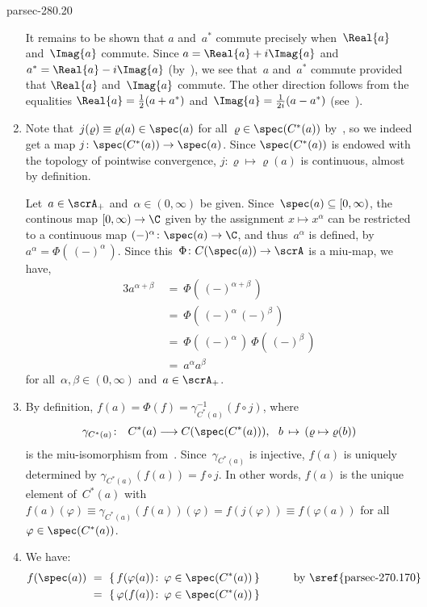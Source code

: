 \documentclass[b5page]{book}
\begin{document}
\begin{solution}{parsec-280.20}
\begin{enumerate}
It remains to be shown that $a$ and~$a^*$
commute precisely when~$\Real{a}$ and~$\Imag{a}$ commute.
Since $a=\Real{a}+i\Imag{a}$
and $a^*=\Real{a}-i\Imag{a}$ (by~),
we see that~$a$ and~$a^*$ commute provided that $\Real{a}$ and~$\Imag{a}$
commute.
The other direction follows from the equalities
$\Real{a}=\frac{1}{2}(a+a^*)$
and~$\Imag{a}=\frac{1}{2i}(a-a^*)$
(see~).

\item
Note that~$j(\varrho)\equiv 
\varrho(a)\in\spec(a)$ for all~$\varrho\in\spec(C^*(a))$ 
by~,
so we indeed get a map $j\colon \spec(C^*(a))\to\spec(a)$.
Since $\spec(C^*(a))$
is endowed with the topology of pointwise convergence,
$j\colon \varrho\mapsto \varrho(a)$
is continuous, almost by definition.

Let~$a\in \scrA_+$ and~$\alpha\in (0,\infty)$ be given.
Since~$\spec(a)\subseteq[0,\infty)$,
the continous map 
$[0,\infty)\to \C$
given
by the assignment $x\mapsto x^\alpha$
can be restricted
to a continuous map $(-)^\alpha\colon \spec(a)\to\C$,
and thus~$a^\alpha$ is defined,
by $a^\alpha = \Phi(\,(-)^\alpha\,)$.
Since this~$\Phi\colon C(\spec(a))\to\scrA$
is a miu-map,
we have,
\begin{alignat*}{3}
a^{\alpha +\beta} \ &=\  \Phi(\,(-)^{\alpha+\beta}\,)
\\
\ &=\  \Phi(\,(-)^\alpha\,(-)^\beta\,) 
\\
&=\  \Phi(\,(-)^\alpha\,)\ \Phi(\,(-)^\beta\,) 
\\
&=\  a^\alpha a^\beta
\end{alignat*}
for all~$\alpha,\beta\in(0,\infty)$ and~$a\in\scrA_+$.
\item
By definition,
$f(a)=\Phi(f)=\gamma_{C^*(a)}^{-1}(f\circ j)$,
where
$$ \gamma_{C^*(a)}\colon\ \ 
C^*(a)\longrightarrow C(\spec( C^*(a))),\ \ 
b\,\mapsto\, (\varrho \mapsto \varrho(b))
$$
is the miu-isomorphism from~.
Since~$\gamma_{C^*(a)}$
is injective,
$f(a)$ is uniquely determined by
$\gamma_{C^*(a)}(f(a))=f\circ j$.
In other words,
$f(a)$ is the unique
element of~$C^*(a)$
with
$f(a)(\varphi)\equiv \gamma_{C^*(a)}(f(a))(\varphi)
= f(j(\varphi))\equiv f(\varphi(a))$
for all~$\varphi \in \spec(C^*(a))$.
\item
We have:
\begin{alignat*}{3}
f(\spec(a))
\ &=\ 
\{\, f(\varphi(a))\colon \, \varphi\in \spec(C^*(a))\,\}
\qquad&&\text{by~\sref{parsec-270.170}} \\
\ &=\ 
\{\, \varphi(f(a))\colon \, \varphi\in \spec(C^*(a))\,\}

\end{alignat*}
\end{enumerate}
\end{solution}
\end{document}
